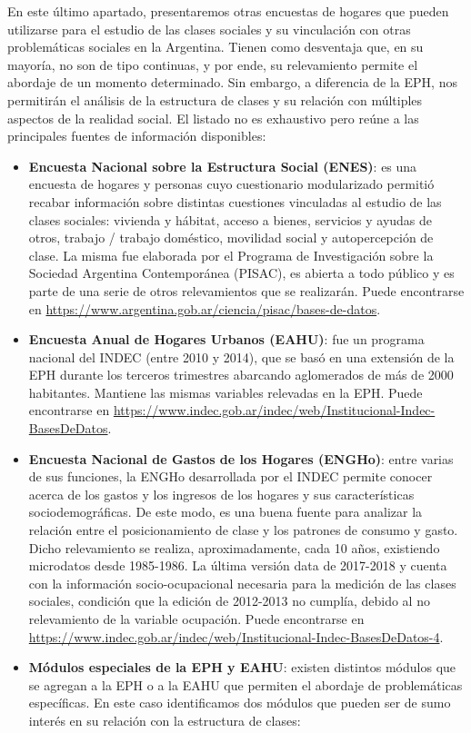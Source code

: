 \documentclass[
]{article}
\begin{document}
En este último apartado, presentaremos otras encuestas de hogares que pueden utilizarse para el estudio de las clases sociales y su vinculación con otras problemáticas sociales en la Argentina. Tienen como desventaja que, en su mayoría, no son de tipo continuas, y por ende, su relevamiento permite el abordaje de un momento determinado. Sin embargo, a diferencia de la EPH, nos permitirán el análisis de la estructura de clases y su relación con múltiples aspectos de la realidad social. El listado no es exhaustivo pero reúne a las principales fuentes de información disponibles:

\begin{itemize}
\item
  \textbf{Encuesta Nacional sobre la Estructura Social (ENES)}: es una encuesta de hogares y personas cuyo cuestionario modularizado permitió recabar información sobre distintas cuestiones vinculadas al estudio de las clases sociales: vivienda y hábitat, acceso a bienes, servicios y ayudas de otros, trabajo / trabajo doméstico, movilidad social y autopercepción de clase. La misma fue elaborada por el Programa de Investigación sobre la Sociedad Argentina Contemporánea (PISAC), es abierta a todo público y es parte de una serie de otros relevamientos que se realizarán. Puede encontrarse en \url{https://www.argentina.gob.ar/ciencia/pisac/bases-de-datos}.
\item
  \textbf{Encuesta Anual de Hogares Urbanos (EAHU)}: fue un programa nacional del INDEC (entre 2010 y 2014), que se basó en una extensión de la EPH durante los terceros trimestres abarcando aglomerados de más de 2000 habitantes. Mantiene las mismas variables relevadas en la EPH. Puede encontrarse en \url{https://www.indec.gob.ar/indec/web/Institucional-Indec-BasesDeDatos}.
\item
  \textbf{Encuesta Nacional de Gastos de los Hogares (ENGHo)}: entre varias de sus funciones, la ENGHo desarrollada por el INDEC permite conocer acerca de los gastos y los ingresos de los hogares y sus características sociodemográficas. De este modo, es una buena fuente para analizar la relación entre el posicionamiento de clase y los patrones de consumo y gasto. Dicho relevamiento se realiza, aproximadamente, cada 10 años, existiendo microdatos desde 1985-1986. La última versión data de 2017-2018 y cuenta con la información socio-ocupacional necesaria para la medición de las clases sociales, condición que la edición de 2012-2013 no cumplía, debido al no relevamiento de la variable ocupación. Puede encontrarse en \url{https://www.indec.gob.ar/indec/web/Institucional-Indec-BasesDeDatos-4}.
\item
  \textbf{Módulos especiales de la EPH y EAHU}: existen distintos módulos que se agregan a la EPH o a la EAHU que permiten el abordaje de problemáticas específicas. En este caso identificamos dos módulos que pueden ser de sumo interés en su relación con la estructura de clases:


\end{itemize}
\end{document}
